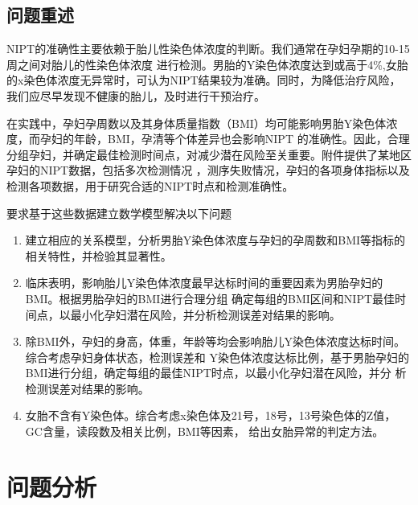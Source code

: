 \documentclass[withoutpreface,notoc]{cumcmthesis}
\begin{document}
	\subsection{问题重述}
	NIPT的准确性主要依赖于胎儿性染色体浓度的判断。我们通常在孕妇孕期的10-15周之间对胎儿的性染色体浓度
	进行检测。男胎的Y染色体浓度达到或高于4\%,女胎的x染色体浓度无异常时，可认为NIPT结果较为准确。同时，为降低治疗风险，
	我们应尽早发现不健康的胎儿，及时进行干预治疗。

	在实践中，孕妇孕周数以及其身体质量指数（BMI）均可能影响男胎Y染色体浓度，而孕妇的年龄，BMI，孕清等个体差异也会影响NIPT
	的准确性。因此，合理分组孕妇，并确定最佳检测时间点，对减少潜在风险至关重要。附件提供了某地区孕妇的NIPT数据，包括多次检测情况
	，测序失败情况，孕妇的各项身体指标以及检测各项数据，用于研究合适的NIPT时点和检测准确性。
	
	要求基于这些数据建立数学模型解决以下问题

	\vspace{-0.5em} %

	\begin{center}
	\begin{minipage}{1\linewidth}
		\begin{enumerate}[leftmargin=*,topsep=0pt,itemsep=0pt,parsep=0pt,partopsep=0pt]
			\item 建立相应的关系模型，分析男胎Y染色体浓度与孕妇的孕周数和BMI等指标的相关特性，并检验其显著性。
			\item 临床表明，影响胎儿Y染色体浓度最早达标时间的重要因素为男胎孕妇的BMI。根据男胎孕妇的BMI进行合理分组
				  确定每组的BMI区间和NIPT最佳时间点，以最小化孕妇潜在风险，并分析检测误差对结果的影响。
			\item 除BMI外，孕妇的身高，体重，年龄等均会影响胎儿Y染色体浓度达标时间。综合考虑孕妇身体状态，检测误差和
				  Y染色体浓度达标比例，基于男胎孕妇的BMI进行分组，确定每组的最佳NIPT时点，以最小化孕妇潜在风险，并分
				  析检测误差对结果的影响。
			\item 女胎不含有Y染色体。综合考虑x染色体及21号，18号，13号染色体的Z值，GC含量，读段数及相关比例，BMI等因素，
				  给出女胎异常的判定方法。
		\end{enumerate}

	\end{minipage}    
	\end{center}
	


	\section{问题分析}
\end{document}
